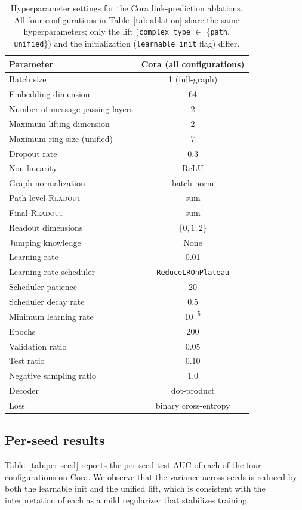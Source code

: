 \documentclass{article}
\begin{document}
\begin{table}[h]
  \centering
  \caption{Hyperparameter settings for the Cora link-prediction ablations. All four configurations in Table~\ref{tab:ablation} share the same hyperparameters; only the lift (\texttt{complex\_type} $\in$ \{\texttt{path}, \texttt{unified}\}) and the initialization (\texttt{learnable\_init} flag) differ.}
  \label{tab:hparams}
  \begin{tabular}{lc}
    \toprule
    Parameter & Cora (all configurations) \\
    \midrule
    Batch size & 1 (full-graph) \\
    Embedding dimension & 64 \\
    Number of message-passing layers & 2 \\
    Maximum lifting dimension & 2 \\
    Maximum ring size (unified) & 7 \\
    Dropout rate & 0.3 \\
    Non-linearity & ReLU \\
    Graph normalization & batch norm \\
    Path-level \textsc{Readout} & sum \\
    Final \textsc{Readout} & sum \\
    Readout dimensions & $\{0, 1, 2\}$ \\
    Jumping knowledge & None \\
    Learning rate & 0.01 \\
    Learning rate scheduler & \texttt{ReduceLROnPlateau} \\
    Scheduler patience & 20 \\
    Scheduler decay rate & 0.5 \\
    Minimum learning rate & $10^{-5}$ \\
    Epochs & 200 \\
    Validation ratio & 0.05 \\
    Test ratio & 0.10 \\
    Negative sampling ratio & 1.0 \\
    Decoder & dot-product \\
    Loss & binary cross-entropy \\
    \bottomrule
  \end{tabular}
\end{table}

\subsection{Per-seed results}
\label{app:per-seed}
Table~\ref{tab:per-seed} reports the per-seed test AUC of each of the four configurations on Cora. We observe that the variance across seeds is reduced by both the learnable init and the unified lift, which is consistent with the interpretation of each as a mild regularizer that stabilizes training.
\end{document}
